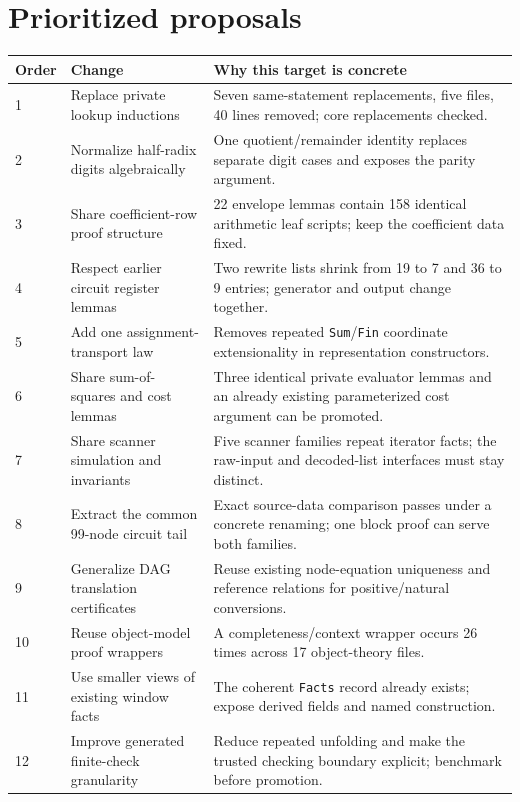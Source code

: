 \documentclass[11pt,letterpaper]{article}
\newcommand{\code}[1]{\nolinkurl{#1}}
\begin{document}
\section{Prioritized proposals}

\begin{longtable}{p{}p{}p{}}
\toprule
Order & Change & Why this target is concrete\\
\midrule
\endhead
1 & Replace private lookup inductions & Seven same-statement replacements,
five files, 40 lines removed; core replacements checked.\\
2 & Normalize half-radix digits algebraically & One quotient/remainder identity
replaces separate digit cases and exposes the parity argument.\\
3 & Share coefficient-row proof structure & 22 envelope lemmas contain 158
identical arithmetic leaf scripts; keep the coefficient data fixed.\\
4 & Respect earlier circuit register lemmas & Two rewrite lists shrink from
19 to 7 and 36 to 9 entries; generator and output change together.\\
5 & Add one assignment-transport law & Removes repeated \code{Sum}/\code{Fin}
coordinate extensionality in representation constructors.\\
6 & Share sum-of-squares and cost lemmas & Three identical private evaluator
lemmas and an already existing parameterized cost argument can be promoted.\\
7 & Share scanner simulation and invariants & Five scanner families repeat
iterator facts; the raw-input and decoded-list interfaces must stay distinct.\\
8 & Extract the common 99-node circuit tail & Exact source-data comparison
passes under a concrete renaming; one block proof can serve both families.\\
9 & Generalize DAG translation certificates & Reuse existing node-equation
uniqueness and reference relations for positive/natural conversions.\\
10 & Reuse object-model proof wrappers & A completeness/context wrapper occurs
26 times across 17 object-theory files.\\
11 & Use smaller views of existing window facts & The coherent \code{Facts}
record already exists; expose derived fields and named construction.\\
12 & Improve generated finite-check granularity & Reduce repeated unfolding
and make the trusted checking boundary explicit; benchmark before promotion.\\
\bottomrule
\end{longtable}
\end{document}
